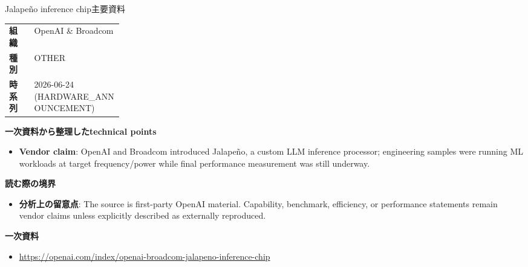 \begin{technicalnote}{Jalapeño inference chip}{主要資料}
\begin{tabularx}{\linewidth}{@{}>{\bfseries}p{0.22\linewidth}X@{}}
組織 & OpenAI \& Broadcom \\
種別 & OTHER \\
時系列 & 2026-06-24 (HARDWARE\_ANNOUNCEMENT) \\
\end{tabularx}
\smallskip
{\bfseries 一次資料から整理したtechnical points}
\begin{itemize}[leftmargin=1.5em,itemsep=0.35em]
\item \textbf{Vendor claim}: OpenAI and Broadcom introduced Jalapeño, a custom LLM inference processor; engineering samples were running ML workloads at target frequency/power while final performance measurement was still underway.
\end{itemize}
{\bfseries 読む際の境界}
\begin{itemize}[leftmargin=1.5em,itemsep=0.35em]
\item \textbf{分析上の留意点}: The source is first-party OpenAI material. Capability, benchmark, efficiency, or performance statements remain vendor claims unless explicitly described as externally reproduced.
\end{itemize}
{\bfseries 一次資料}
\begingroup\sloppy
\begin{itemize}[leftmargin=1.5em,itemsep=0.25em]
\item {\scriptsize\url{https://openai.com/index/openai-broadcom-jalapeno-inference-chip}}
\end{itemize}
\endgroup
\end{technicalnote}
\medskip

